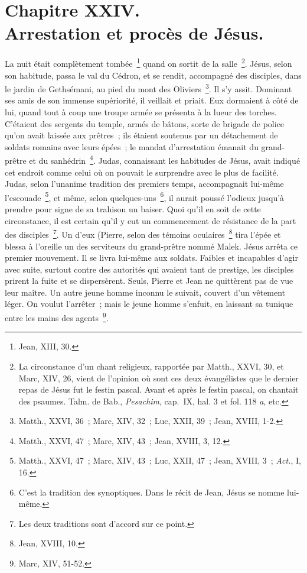 \documentclass[french,twoside]{book} %
\newcommand\chapteropen{} %
\newcommand\chaptercont{} %
\begin{document}
\chapteropen
\chapter[{Chapitre XXIV. Arrestation et procès de Jésus.}]{Chapitre XXIV.\\
Arrestation et procès de Jésus.}\renewcommand{\leftmark}{Chapitre XXIV.\\
Arrestation et procès de Jésus.}


\chaptercont
\noindent La nuit était complètement tombée \footnote{Jean, XIII, 30.} quand on sortit de la salle \footnote{ La circonstance d’un chant religieux, rapportée par Matth., XXVI, 30, et Marc, XIV, 26, vient de l’opinion où sont ces deux évangélistes que le dernier repas de Jésus fut le festin pascal. Avant et après le festin pascal, on chantait des psaumes. Talm. de Bab., {\itshape Pesachim}, cap. IX, hal. 3 et fol. 118 {\itshape a}, etc.}. Jésus, selon son habitude, passa le val du Cédron, et se rendit, accompagné des disciples, dans le jardin de Gethsémani, au pied du mont des Oliviers \footnote{Matth., XXVI, 36 ; Marc, XIV, 32 ; Luc, XXII, 39 ; Jean, XVIII, 1-2.}. Il s’y assit. Dominant ses amis de son immense supériorité, il veillait et priait. Eux dormaient à côté de lui, quand tout à coup une troupe armée se présenta à la lueur des torches. C’étaient des sergents du temple, armés de bâtons, sorte de brigade de police qu’on avait laissée aux prêtres ; ils étaient soutenus par un détachement de soldats romains avec leurs épées ; le mandat d’arrestation émanait du grand-prêtre et du sanhédrin \footnote{Matth., XXVI, 47 ; Marc, XIV, 43 ; Jean, XVIII, 3, 12.}. Judas, connaissant les habitudes de Jésus, avait indiqué cet endroit comme celui où on pouvait le surprendre avec le plus de facilité. Judas, selon l’unanime tradition des premiers temps, accompagnait lui-même l’escouade \footnote{ Matth., XXVI, 47 ; Marc, XIV, 43 ; Luc, XXII, 47 ; Jean, XVIII, 3 ; {\itshape Act.}, I, 16.}, et même, selon quelques-uns \footnote{C’est la tradition des synoptiques. Dans le récit de Jean, Jésus se nomme lui-même.}, il aurait poussé l’odieux jusqu’à prendre pour signe de sa trahison un baiser. Quoi qu’il en soit de cette circonstance, il est certain qu’il y eut un commencement de résistance de la part des disciples \footnote{Les deux traditions sont d’accord sur ce point.}. Un d’eux (Pierre, selon des témoins oculaires \footnote{Jean, XVIII, 10.} tira l’épée et blessa à l’oreille un des serviteurs du grand-prêtre nommé Malek. Jésus arrêta ce premier mouvement. Il se livra lui-même aux soldats. Faibles et incapables d’agir avec suite, surtout contre des autorités qui avaient tant de prestige, les disciples prirent la fuite et se dispersèrent. Seuls, Pierre et Jean ne quittèrent pas de vue leur maître. Un autre jeune homme inconnu le suivait, couvert d’un vêtement léger. On voulut l’arrêter ; mais le jeune homme s’enfuit, en laissant sa tunique entre les mains des agents \footnote{Marc, XIV, 51-52.}.\par
\end{document}
